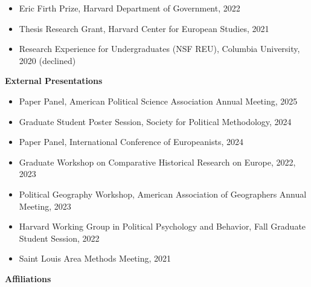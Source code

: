 \documentclass[12pt]{article}
\begin{document}
\begin{footnotesize}
\begin{itemize}[noitemsep,nolistsep]
\item Eric Firth Prize, Harvard Department of Government, 2022

\item Thesis Research Grant, Harvard Center for European Studies, 2021 

\item Research Experience for Undergraduates (NSF REU), Columbia University, 2020 (declined)

\end{itemize}

\vspace{5mm} 







{\bf {\normalsize External Presentations}}

\vspace{3mm} 

\begin{itemize}[noitemsep,nolistsep]

\item Paper Panel, American Political Science Association Annual Meeting, 2025

\item Graduate Student Poster Session, Society for Political Methodology, 2024

\item Paper Panel, International Conference of Europeanists, 2024

\item Graduate Workshop on Comparative Historical Research on Europe, 2022, 2023

\item Political Geography Workshop, American Association of Geographers Annual Meeting, 2023

\item Harvard Working Group in Political Psychology and Behavior, Fall Graduate Student Session, 2022

\item Saint Louis Area Methods Meeting, 2021

\end{itemize}


\vspace{5mm} 


{\bf {\normalsize Affiliations}}

\vspace{3mm} 

\begin{itemize}


\end{itemize}
\end{footnotesize}
\end{document}
